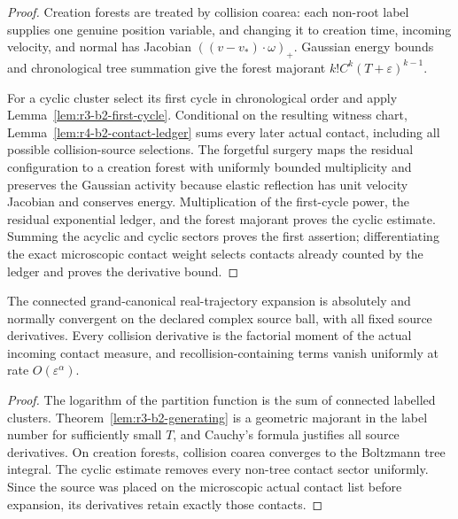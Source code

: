 \begin{proof}
Creation forests are treated by collision coarea: each non-root label supplies
one genuine position variable, and changing it to creation time, incoming
velocity, and normal has Jacobian
\(((v-v_*)\cdot\omega)_+\).  Gaussian energy bounds and chronological tree
summation give the forest majorant
\(k!C^k(T+\varepsilon)^{k-1}\).

For a cyclic cluster select its first cycle in chronological order and apply
Lemma~\ref{lem:r3-b2-first-cycle}.  Conditional on the resulting witness
chart, Lemma~\ref{lem:r4-b2-contact-ledger} sums every later actual contact,
including all possible collision-source selections.  The forgetful surgery
maps the residual configuration to a creation forest with uniformly bounded
multiplicity and preserves the Gaussian activity because elastic reflection
has unit velocity Jacobian and conserves energy.  Multiplication of the
first-cycle power, the residual exponential ledger, and the forest majorant
proves the cyclic estimate.  Summing the acyclic and cyclic sectors proves the
first assertion; differentiating the exact microscopic contact weight selects
contacts already counted by the ledger and proves the derivative bound.
\end{proof}

\begin{corollary}
\label{thm:r3-b2-gc-cluster}
The connected grand-canonical real-trajectory expansion is absolutely and
normally convergent on the declared complex source ball, with all fixed source
derivatives.  Every collision derivative is the factorial moment of the
actual incoming contact measure, and recollision-containing terms vanish
uniformly at rate \(O(\varepsilon^\alpha)\).
\end{corollary}

\begin{proof}
The logarithm of the partition function is the sum of connected labelled
clusters.  Theorem~\ref{lem:r3-b2-generating} is a geometric majorant in the
label number for sufficiently small \(T\), and Cauchy's formula justifies all
source derivatives.  On creation forests, collision coarea converges to the
Boltzmann tree integral.  The cyclic estimate removes every non-tree contact
sector uniformly.  Since the source was placed on the microscopic actual
contact list before expansion, its derivatives retain exactly those contacts.
\end{proof}
